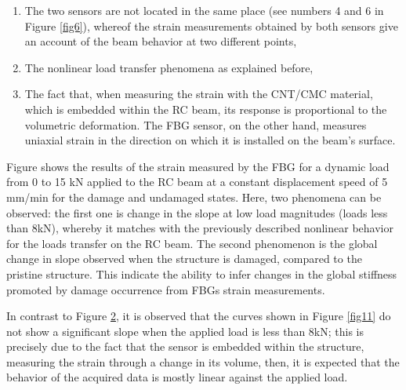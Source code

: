 \documentclass[twocolumn]{bmcart}%
\begin{document}
\begin{enumerate}

 \item  The two sensors are not located in the same place (see numbers 4 and 6 in Figure \ref{fig6}), whereof the strain measurements obtained by both sensors give an account of the beam behavior at two different points,

 \item  The nonlinear load transfer phenomena as explained before, 

 \item  The fact that, when measuring the strain with the CNT/CMC material, which is embedded within the RC beam, its response is proportional to the volumetric deformation. The FBG sensor, on the other hand, measures uniaxial strain in the direction on which it is installed on the beam’s surface.

\end{enumerate}

\begin{figure}[h!]
  \caption{
      }
      \label{fig12}
      \end{figure}



Figure  shows the results of the strain measured by the FBG for a dynamic load from 0 to 15 kN applied to the RC beam at a constant displacement speed of 5 mm/min for the damage and undamaged states. Here, two phenomena can be observed: the first one is change in the slope at low load magnitudes (loads less than 8kN), whereby it matches with the previously described nonlinear behavior for the loads transfer on the RC beam. The second phenomenon is the global change in slope observed when the structure is damaged, compared to the pristine structure. This indicate the ability to infer changes in the global stiffness promoted by damage occurrence from FBGs strain measurements.

\begin{figure}[h!]
  \caption{
      }
      \label{fig13}
      \end{figure}



In contrast to Figure \ref{fig13}, it is observed that the curves shown in Figure \ref{fig11} do not show a significant slope when the applied load is less than 8kN; this is precisely due to the fact that the sensor is embedded within the structure, measuring the strain through a change in its volume, then, it is expected that the behavior of the acquired data is mostly linear against the applied load.
\end{document}
